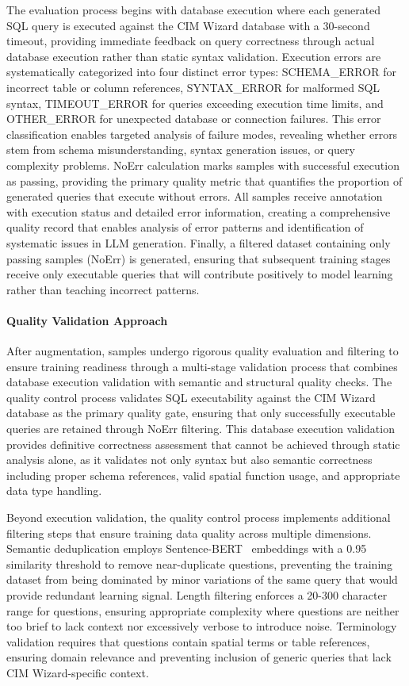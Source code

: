 The evaluation process begins with database execution where each generated SQL query is executed against the CIM Wizard database with a 30-second timeout, providing immediate feedback on query correctness through actual database execution rather than static syntax validation. Execution errors are systematically categorized into four distinct error types: SCHEMA\_ERROR for incorrect table or column references, SYNTAX\_ERROR for malformed SQL syntax, TIMEOUT\_ERROR for queries exceeding execution time limits, and OTHER\_ERROR for unexpected database or connection failures. This error classification enables targeted analysis of failure modes, revealing whether errors stem from schema misunderstanding, syntax generation issues, or query complexity problems. NoErr calculation marks samples with successful execution as passing, providing the primary quality metric that quantifies the proportion of generated queries that execute without errors. All samples receive annotation with execution status and detailed error information, creating a comprehensive quality record that enables analysis of error patterns and identification of systematic issues in LLM generation. Finally, a filtered dataset containing only passing samples (NoErr) is generated, ensuring that subsequent training stages receive only executable queries that will contribute positively to model learning rather than teaching incorrect patterns.

\paragraph{Quality Validation Approach}

After augmentation, samples undergo rigorous quality evaluation and filtering to ensure training readiness through a multi-stage validation process that combines database execution validation with semantic and structural quality checks. The quality control process validates SQL executability against the CIM Wizard database as the primary quality gate, ensuring that only successfully executable queries are retained through NoErr filtering. This database execution validation provides definitive correctness assessment that cannot be achieved through static analysis alone, as it validates not only syntax but also semantic correctness including proper schema references, valid spatial function usage, and appropriate data type handling.

Beyond execution validation, the quality control process implements additional filtering steps that ensure training data quality across multiple dimensions. Semantic deduplication employs Sentence-BERT~\cite{reimers2019sentence} embeddings with a 0.95 similarity threshold to remove near-duplicate questions, preventing the training dataset from being dominated by minor variations of the same query that would provide redundant learning signal. Length filtering enforces a 20-300 character range for questions, ensuring appropriate complexity where questions are neither too brief to lack context nor excessively verbose to introduce noise. Terminology validation requires that questions contain spatial terms or table references, ensuring domain relevance and preventing inclusion of generic queries that lack CIM Wizard-specific context.

